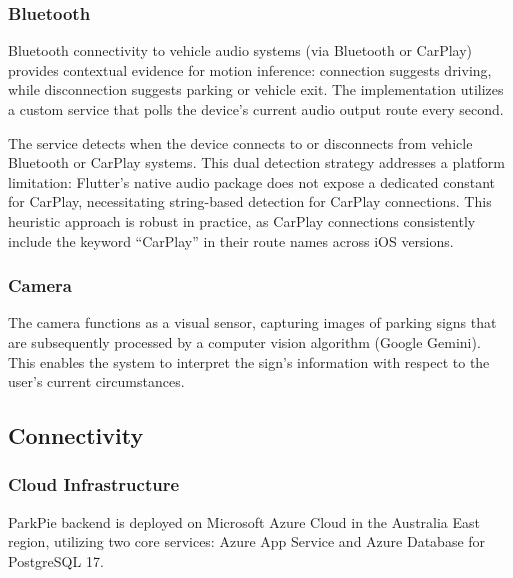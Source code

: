 \subsubsection{Bluetooth}

Bluetooth connectivity to vehicle audio systems (via Bluetooth or CarPlay) provides contextual evidence for motion inference: connection suggests driving, while disconnection suggests parking or vehicle exit. The implementation utilizes a custom service that polls the device's current audio output route every second.

The service detects when the device connects to or disconnects from vehicle Bluetooth or CarPlay systems. This dual detection strategy addresses a platform limitation: Flutter's native audio package does not expose a dedicated constant for CarPlay, necessitating string-based detection for CarPlay connections. This heuristic approach is robust in practice, as CarPlay connections consistently include the keyword ``CarPlay'' in their route names across iOS versions.

\subsubsection{Camera}

The camera functions as a visual sensor, capturing images of parking signs that are subsequently processed by a computer vision algorithm (Google Gemini). This enables the system to interpret the sign’s information with respect to the user's current circumstances.

\subsection{Connectivity}

\subsubsection{Cloud Infrastructure}

ParkPie backend is deployed on Microsoft Azure Cloud in the Australia East region, utilizing two core services: Azure App Service and Azure Database for PostgreSQL 17.

